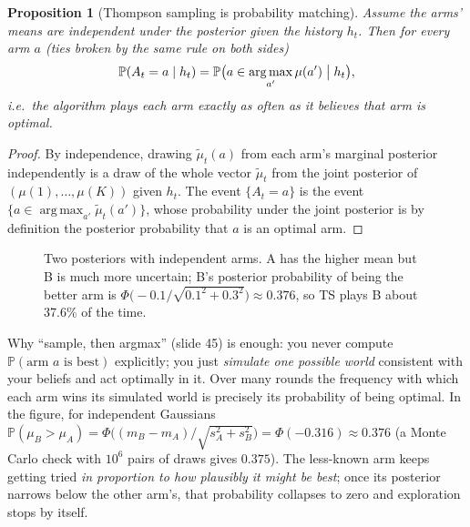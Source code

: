 \documentclass[11pt,a4paper]{article}
\newcommand{\Prob}{\mathbb{P}}
\newcommand{\Norm}{\mathcal{N}}
\DeclareMathOperator*{\argmax}{arg\,max}
\theoremstyle{plain}
\newtheorem{proposition}[theorem]{Proposition}
\theoremstyle{definition}
\theoremstyle{remark}
\begin{document}
\begin{proposition}[Thompson sampling is probability matching]\label{prop:pm}
Assume the arms' means are independent under the posterior given the history $h_t$. Then for every arm $a$ (ties broken by the same rule on both sides)
\[
 \Prob(A_t=a\mid h_t)=\Prob\bigl(a\in\argmax_{a'}\mu(a')\bigm|h_t\bigr),
\]
i.e.\ the algorithm plays each arm exactly as often as it believes that arm is optimal.
\end{proposition}
\begin{proof}
By independence, drawing $\tilde\mu_t(a)$ from each arm's marginal posterior independently is a draw of the whole vector $\tilde\mu_t$ from the joint posterior of $(\mu(1),\dots,\mu(K))$ given $h_t$.
The event $\{A_t=a\}$ is the event $\{a\in\argmax_{a'}\tilde\mu_t(a')\}$, whose probability under the joint posterior is by definition the posterior probability that $a$ is an optimal arm.
\end{proof}

\begin{figure}[ht]
\centering
{}
\caption{Two posteriors with independent arms. A has the higher mean but B is much more uncertain; B's posterior probability of being the better arm is $\Phi\bigl(-0.1/\sqrt{0.1^2+0.3^2}\bigr)\approx0.376$, so TS plays B about 37.6\% of the time.}
\end{figure}

\begin{intuition}
Why ``sample, then argmax'' (slide 45) is enough: you never compute $\Prob(\text{arm }a\text{ is best})$ explicitly; you just \emph{simulate one possible world} consistent with your beliefs and act optimally in it. Over many rounds the frequency with which each arm wins its
simulated world is precisely its probability of being optimal. In the figure, for independent Gaussians $\Prob(\mu_B>\mu_A)=\Phi\bigl((m_B-m_A)/\sqrt{s_A^2+s_B^2}\bigr)=\Phi(-0.316)\approx0.376$ (a Monte Carlo check with $10^6$ pairs of draws gives $0.375$). The less-known arm keeps getting tried
\emph{in proportion to how plausibly it might be best}; once its posterior narrows below the other arm's, that probability collapses to zero and exploration stops by itself.
\end{intuition}
\end{document}
